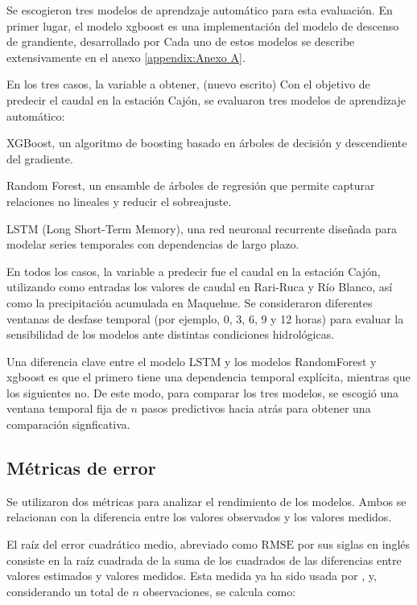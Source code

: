 \documentclass[hess, manuscript]{copernicus}
\begin{document}
Se escogieron tres modelos de aprendzaje automático para esta evaluación. En primer lugar, el modelo xgboost es una implementación del modelo de descenso de grandiente, desarrollado por Cada uno de estos modelos se describe extensivamente en el anexo \ref{appendix:Anexo A}.

En los tres casos, la variable a obtener,
(nuevo escrito)
Con el objetivo de predecir el caudal en la estación Cajón, se evaluaron tres modelos de aprendizaje automático:

XGBoost, un algoritmo de boosting basado en árboles de decisión y descendiente del gradiente.

Random Forest, un ensamble de árboles de regresión que permite capturar relaciones no lineales y reducir el sobreajuste.

LSTM (Long Short-Term Memory), una red neuronal recurrente diseñada para modelar series temporales con dependencias de largo plazo.

En todos los casos, la variable a predecir fue el caudal en la estación Cajón, utilizando como entradas los valores de caudal en Rari-Ruca y Río Blanco, así como la precipitación acumulada en Maquehue. Se consideraron diferentes ventanas de desfase temporal (por ejemplo, 0, 3, 6, 9 y 12 horas) para evaluar la sensibilidad de los modelos ante distintas condiciones hidrológicas.

Una diferencia clave entre el modelo LSTM y los modelos RandomForest y xgboost es que el primero tiene una dependencia temporal explícita, mientras que los siguientes no. De este modo, para comparar los tres modelos, se escogió una ventana temporal fija de $n$ pasos predictivos hacia atrás para obtener una comparación signficativa.

\subsection{Métricas de error}

Se utilizaron dos métricas para analizar el rendimiento de los modelos. Ambos se relacionan con la diferencia entre los valores observados y los valores medidos.

El raíz del error cuadrático medio, abreviado como $\mathrm{RMSE}$ por sus siglas en inglés consiste en la raíz cuadrada de la suma de los cuadrados de las diferencias entre valores estimados y valores medidos. Esta medida ya ha sido usada por \citet{luppichini_machine_2024}, y, considerando un total de $n$ observaciones, se calcula como:
\end{document}

